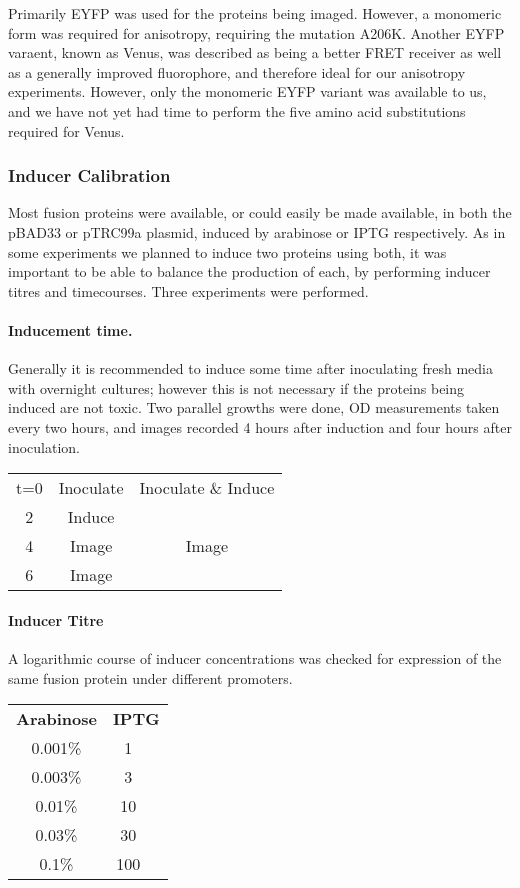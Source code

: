 \documentclass[../main.tex]{subfiles}
\begin{document}
Primarily EYFP was used for the proteins being imaged. However, a monomeric form was required for anisotropy\cite{vaknin07}, requiring the mutation A206K. Another EYFP varaent, known as Venus, was described as being a better FRET receiver\cite{nagai02} as well as a generally improved fluorophore, and therefore ideal for our anisotropy experiments. However, only the monomeric EYFP variant was available to us, and we have not yet had time to perform the five amino acid substitutions required for Venus.

\subsubsection{Inducer Calibration}

Most fusion proteins were available, or could easily be made available, in both the pBAD33 or pTRC99a plasmid, induced by arabinose or IPTG respectively. As in some experiments we planned to induce two proteins using both, it was important to be able to balance the production of each, by performing inducer titres and timecourses. Three experiments were performed.

\paragraph{Inducement time.} Generally it is recommended to induce some time after inoculating fresh media with overnight cultures; however this is not necessary if the proteins being induced are not toxic. Two parallel growths were done, OD measurements taken every two hours, and images recorded 4 hours after induction and four hours after inoculation.
\begin{center}
\begin{tabular}{ccc}
t=0	&	Inoculate	&	Inoculate \& Induce\\
2	&	Induce	&\\
4	&	Image	&	Image\\
6	&	Image	&
\end{tabular}
\end{center}

\paragraph{Inducer Titre} A logarithmic course of inducer concentrations was checked for expression of the same fusion protein under different promoters.

\begin{center}
\begin{tabular}{cc}
\textbf{Arabinose}	&	\textbf{IPTG} 	\\
0.001\%	&	\SI{1}{\micro\Molar}\\
0.003\%	&	\SI{3}{\micro\Molar}\\
0.01\%	&	\SI{10}{\micro\Molar}\\
0.03\%	&	\SI{30}{\micro\Molar}\\
0.1\%	&	\SI{100}{\micro\Molar}\\

\end{tabular}
\end{center}
\end{document}
